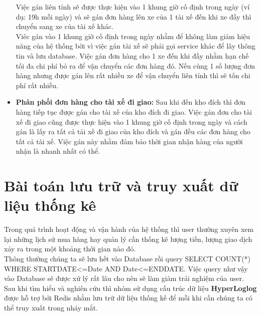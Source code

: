 \begin{itemize}
                Việc gán liên tỉnh sẽ được thực hiện vào 1 khung giờ cố định trong ngày (ví dụ: 19h mỗi ngày) và sẽ gán đơn hàng lên xe của 1 tài xế đến khi xe đầy thì chuyển sang xe của tài xế khác.\\
                
                Viêc gán vào 1 khung giờ cố định trong ngày nhằm để không làm giảm hiệu năng của hệ thống bời vì việc gán tài xế sẽ phải gọi service khác để lây thông tin và lưu database. Việc gán đơn hàng cho 1 xe đến khi đầy nhằm hạn chế tối đa chi phí bỏ ra để vận chuyển các đơn hàng đó. Nếu cùng 1 số lượng đơn hàng nhưng được gán lên rất nhiều xe để vận chuyển liên tỉnh thì sẽ tốn chi phí rất nhiều.
                
                \item \textbf{Phân phối đơn hàng cho tài xế  đi giao:} Sau khi đến kho đích thì đơn hàng tiếp tục được gán cho tài xế của kho đích đi giao. Việc gán đơn cho tài xế đi giao cũng được thực hiện vào 1 khung giờ cố định trong ngày và cách gán là lấy ra tất cả tải xế đi giao của kho đích và gán đều các đơn hàng cho tất cả tài xế. Việc gán này nhằm đảm bảo thời gian nhận hàng của người nhận là nhanh nhất có thể.
                
            \end{itemize}
            
            
            \section{Bài toán lưu trữ và truy xuất dữ liệu thống kê}
                Trong quá trình hoạt động và vận hành của hệ thống thì user thường xuyên xem lại những lịch sử mua hàng hay quản lý cần thống kê lượng tiền, lượng giao dịch xảy ra trong một khoảng thời gian nào đó.\\
                
                Thông thường chúng ta sẽ lưu hết vào Database rồi query SELECT COUNT(*) WHERE STARTDATE<=Date AND Date<=ENDDATE. Việc query như vậy vào Database sẽ được xử lý rất lâu cho nên sẽ làm giảm trải nghiệm của user.\\
                
                Sau khi tìm hiểu và nghiên cứu thì nhóm sử dụng cấu trúc dữ liệu \textbf{HyperLoglog}\cite{hyperloglog} được hỗ trợ bởi Redis nhằm lưu trữ dữ liệu thống kế để mỗi khi cần chúng ta có thể truy xuất trong nháy mắt.\\
                
